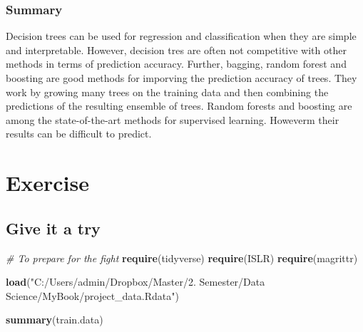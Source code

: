 \documentclass[]{report}
\newenvironment{Shaded}{\begin{snugshade}}{\end{snugshade}}
\newcommand{\KeywordTok}[1]{\textcolor[rgb]{0.13,0.29,0.53}{\textbf{#1}}}
\newcommand{\DataTypeTok}[1]{\textcolor[rgb]{0.13,0.29,0.53}{#1}}
\newcommand{\DecValTok}[1]{\textcolor[rgb]{0.00,0.00,0.81}{#1}}
\newcommand{\StringTok}[1]{\textcolor[rgb]{0.31,0.60,0.02}{#1}}
\newcommand{\CommentTok}[1]{\textcolor[rgb]{0.56,0.35,0.01}{\textit{#1}}}
\newcommand{\OperatorTok}[1]{\textcolor[rgb]{0.81,0.36,0.00}{\textbf{#1}}}
\newcommand{\NormalTok}[1]{#1}
\begin{document}
\begin{Shaded}
\end{Shaded}

\section{Summary}\label{summary}

Decision trees can be used for regression and classification when they
are simple and interpretable. However, decision tres are often not
competitive with other methods in terms of prediction accuracy. Further,
bagging, random forest and boosting are good methods for imporving the
prediction accuracy of trees. They work by growing many trees on the
training data and then combining the predictions of the resulting
ensemble of trees. Random forests and boosting are among the
state-of-the-art methods for supervised learning. Howeverm their results
can be difficult to predict.

\part{Exercise}\label{part-exercise}

\chapter{Give it a try}\label{give-it-a-try}

\begin{Shaded}
\begin{Highlighting}[]
\CommentTok{# To prepare for the fight}
\KeywordTok{require}\NormalTok{(tidyverse)}
\KeywordTok{require}\NormalTok{(ISLR)}
\KeywordTok{require}\NormalTok{(magrittr)}


\KeywordTok{load}\NormalTok{(}\StringTok{"C:/Users/admin/Dropbox/Master/2. Semester/Data Science/MyBook/project_data.Rdata"}\NormalTok{)}

\KeywordTok{summary}\NormalTok{(train.data)}
\end{Highlighting}
\end{Shaded}
\end{document}
